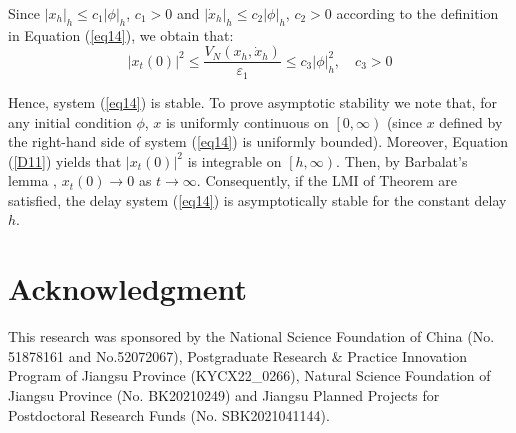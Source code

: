 \documentclass[a4paper]{cas-sc}
\begin{document}
Since ${\left| {{x_h}} \right|_h} \leqslant {c_1}|\phi {|_h}$, ${c_1} > 0$ \citep{Hale2013} and ${\left| {{{\dot x}_h}} \right|_h} \leqslant {c_2}|\phi {|_h}$, ${c_2} > 0$ according to the definition in Equation (\ref{eq14}), we obtain that:
\begin{equation}
  {\left| {{x_t}(0)} \right|^2} \leqslant \frac{{{V_N}\left( {{x_h},{{\dot x}_h}} \right)}}{{{\varepsilon _1}}} \leqslant {c_3}|\phi |_h^2,\quad {c_3} > 0
  \label{D13}
\end{equation}

Hence, system (\ref{eq14}) is stable. To prove asymptotic stability we note that, for any initial condition $\phi $, $x$ is uniformly continuous on $\left[ {0,\infty } \right)$ (since $x$ defined by the right-hand side of system (\ref{eq14}) is uniformly bounded). Moreover, Equation (\ref{D11}) yields that ${\left| {{x_t}(0)} \right|^2}$ is integrable on $\left[ {h,\infty } \right)$. Then, by Barbalat's lemma \citep{Min2007}, ${x_t}(0) \to 0$ as $t \to \infty $. Consequently, if the LMI of Theorem are satisfied, the delay system (\ref{eq14}) is asymptotically stable for the constant delay $h$.




\printcredits

\section*{Acknowledgment}

This research was sponsored by the National Science Foundation of China (No. 51878161 and No.52072067), Postgraduate Research \& Practice Innovation Program of Jiangsu Province (KYCX22\_0266), Natural Science Foundation of Jiangsu Province (No. BK20210249) and Jiangsu Planned Projects for Postdoctoral Research Funds (No. SBK2021041144).

% 





\end{document}
